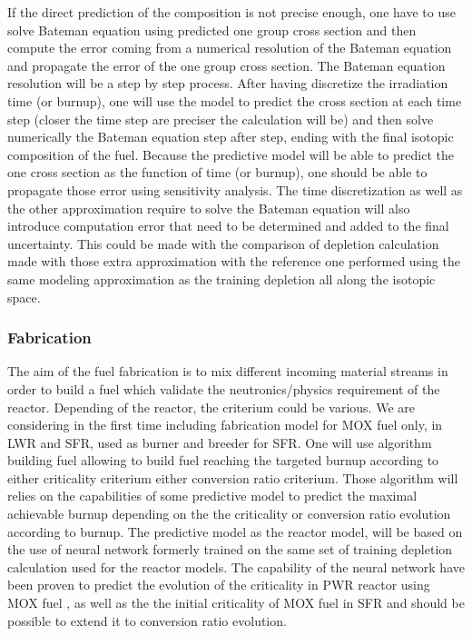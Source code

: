 \documentclass[dvips,12pt]{article}
\begin{document}
If the direct prediction of the composition is not
precise enough, one have to use solve Bateman
equation using predicted one group cross section
and then compute the error coming from a numerical
resolution of the Bateman equation and propagate
the error of the one group cross section.  The
Bateman equation resolution will be a step by step
process. After having discretize the irradiation
time (or burnup), one will use the model to
predict the cross section at each time step
(closer the time step are preciser the calculation
will be) and then solve numerically the Bateman
equation step after step, ending with the final
isotopic composition of the fuel. Because the
predictive model will be able to predict the one
cross section as the function of time (or burnup),
one should be able to propagate those error using
sensitivity analysis.  The time discretization as
well as the other approximation require to solve
the Bateman equation will also introduce
computation error that need to be determined and
added to the final uncertainty. This could be made
with the comparison of depletion calculation made
with those extra approximation with the reference
one performed using the same modeling
approximation as the training depletion all along
the isotopic space.



\subsubsection{Fabrication} \label{sec:fabrication}
The aim of the fuel fabrication is to mix
different incoming material streams in order to
build a fuel which validate the neutronics/physics
requirement of the reactor. Depending of the
reactor, the criterium could be various. We are
considering in the first time including
fabrication model for MOX fuel only, in LWR and
SFR, used as burner and breeder for SFR. One will
use algorithm building fuel allowing to build fuel
reaching the targeted burnup according to either
criticality criterium either conversion ratio
criterium.  Those algorithm will relies on the
capabilities of some predictive model to predict
the maximal achievable burnup depending on the the
criticality or conversion ratio evolution
according to burnup.  The predictive model as the
reactor model, will be based on the use of neural
network formerly trained on the same set of
training depletion calculation used for the
reactor models. The capability of the neural
network have been proven to predict the evolution
of the criticality in PWR reactor using MOX fuel
\cite{Leniaux.NN, CLASS_UserManual}, as well as
the the initial criticality of MOX fuel in SFR
\cite{CLASS UserManual} and should be possible to
extend it to conversion ratio evolution.
\end{document}
